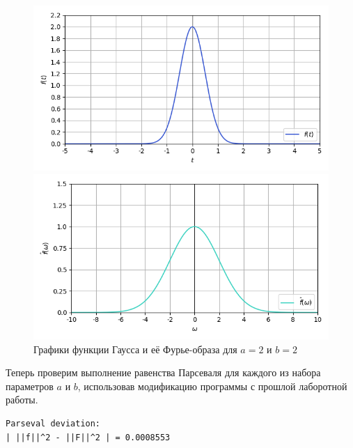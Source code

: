 \documentclass[a4paper]{article}
\begin{document}
\begin{figure}[H]
    \begin{minipage}{0.5\textwidth}
        \centering \includegraphics[width=\textwidth]{sources/4_gaussian/graph_3.png}
    \end{minipage}\hfill
    \begin{minipage}{0.5\textwidth}
        \centering \includegraphics[width=\textwidth]{sources/4_gaussian/fourier_3.png}
    \end{minipage}
    \caption{Графики функции Гаусса и её Фурье-образа для $a = 2$ и $b = 2$} 
\end{figure}
\noindent Теперь проверим выполнение равенства Парсеваля для каждого из набора параметров $a$ и $b$, использовав модификацию программы с прошлой лаборотной работы.\\
\begin{minipage}{0.33\textwidth}
\begin{lstlisting}[caption={$a = 1$, $b = 1$}]
Parseval deviation:
| ||f||^2 - ||F||^2 | = 0.0008553
\end{lstlisting}
\end{minipage}\hfill
\end{document}
